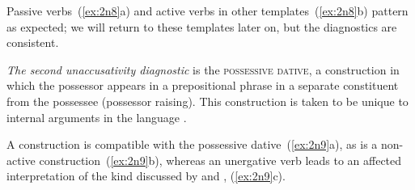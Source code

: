 \begin{exe}
\begin{xlist}
\begin{exe}
\begin{xlist}
\begin{exe}
\begin{xlist}
\begin{exe}
\begin{exe}
\begin{xlist}
\begin{exe}
\begin{xlist}
 \begin{exe}\judgewidth{\#}
 \ex  \label{ex:2n7}
 \begin{xlist} 
	
	
 \z
\z 

Passive verbs~(\ref{ex:2n8}a) and active verbs in other templates~(\ref{ex:2n8}b) pattern as expected; we will return to these templates later on, but the diagnostics are consistent.
 \begin{exe}\judgewidth{\#}
 \ex  \label{ex:2n8}
 \begin{xlist} 
	
	
 \z
\z 

\textit{The second unaccusativity diagnostic} is the \textsc{possessive dative}, a construction in which the possessor appears in a prepositional phrase in a separate constituent from the possessee (possessor raising). This construction is taken to be unique to internal arguments in the language \citep{borergrodzinsky86,borer98csli}.

A  construction is compatible with the possessive dative~(\ref{ex:2n9}a), as is a non-active construction~(\ref{ex:2n9}b), whereas an unergative verb leads to an affected interpretation of the kind discussed by \cite{arieletal15} and \cite{barashersiegalboneh16}, (\ref{ex:2n9}c). 


\end{xlist}
\end{exe}
\end{xlist}
\end{exe}
\end{xlist}
\end{exe}
\end{xlist}
\end{exe}
\end{exe}
\end{xlist}
\end{exe}
\end{xlist}
\end{exe}
\end{xlist}
\end{exe}
